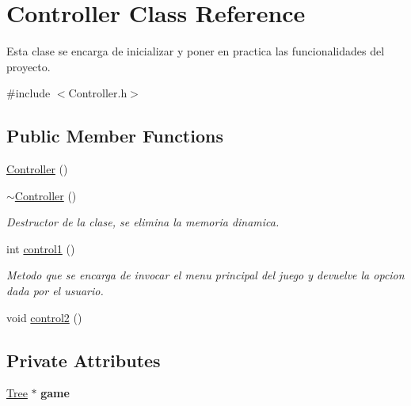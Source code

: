 \hypertarget{class_controller}{}\section{Controller Class Reference}
\label{class_controller}


Esta clase se encarga de inicializar y poner en practica las funcionalidades del proyecto.  




{\ttfamily \#include $<$Controller.\+h$>$}

\subsection*{Public Member Functions}
\begin{DoxyCompactItemize}
\item 
\mbox{\hyperlink{class_controller_a95c56822d667e94b031451729ce069a9}{Controller}} ()
\item 
\mbox{\label{class_controller_a0ab87934c4f7a266cfdb86e0f36bc1b5}} 
\mbox{\hyperlink{class_controller_a0ab87934c4f7a266cfdb86e0f36bc1b5}{$\sim$\+Controller}} ()
\begin{DoxyCompactList}\small\item\em Destructor de la clase, se elimina la memoria dinamica. \end{DoxyCompactList}\item 
\mbox{\label{class_controller_af6b022efd09bd17840747942103f0b14}} 
int \mbox{\hyperlink{class_controller_af6b022efd09bd17840747942103f0b14}{control1}} ()
\begin{DoxyCompactList}\small\item\em Metodo que se encarga de invocar el menu principal del juego y devuelve la opcion dada por el usuario. \end{DoxyCompactList}\item 
void \mbox{\hyperlink{class_controller_a179fd6c4df220688036776f10dd5373c}{control2}} ()
\end{DoxyCompactItemize}
\subsection*{Private Attributes}
\begin{DoxyCompactItemize}
\item 
\mbox{\label{class_controller_a1db1d2da9da4e5b6afc5194609d67e8a}} 
\mbox{\hyperlink{class_tree}{Tree}} $\ast$ {\bfseries game}
\end{DoxyCompactItemize}


